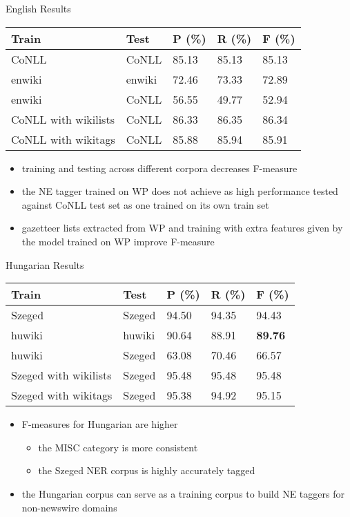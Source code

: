 \documentclass[utf8x,t]{beamer}
\newcommand{\vitem}{\item \vspace{4pt}}
\begin{document}
\begin{frame}{English Results}

\begin{center}
\begin{tabular}{lllll}
\hline \bf Train & \bf Test & \bf P (\%) & \bf R (\%) & \bf F (\%) \\ \hline
CoNLL & CoNLL & 85.13 & 85.13 & 85.13 \\
enwiki & enwiki & 72.46 & 73.33 &  72.89 \\
enwiki & CoNLL & 56.55 & 49.77 & 52.94 \\
CoNLL with wikilists & CoNLL & 86.33 & 86.35 & 86.34 \\
CoNLL with wikitags & CoNLL & 85.88 & 85.94 & 85.91 \\
\hline
\end{tabular}
\end{center}

\begin{itemize}
\item training and testing across different corpora decreases F-measure
\item the NE tagger trained on WP does not achieve as high performance tested against CoNLL test set as one trained on its own train set
\item gazetteer lists extracted from WP and training with extra features given by the model trained on WP improve F-measure
\end{itemize}

\end{frame}

\begin{frame}{Hungarian Results}

\begin{center}
\begin{tabular}{lllll}
\hline \bf Train & \bf Test & \bf P (\%) & \bf R (\%) & \bf F (\%) \\ \hline
Szeged  & Szeged  & 94.50 & 94.35 & 94.43 \\
huwiki & huwiki & 90.64 & 88.91 &  \textbf{89.76} \\
huwiki & Szeged  & 63.08 & 70.46 & 66.57 \\
Szeged  with wikilists & Szeged  & 95.48 & 95.48 & 95.48 \\
Szeged  with wikitags & Szeged  & 95.38 & 94.92 & 95.15 \\
\hline
\end{tabular}
\end{center}

\begin{itemize}
\vitem F-measures for Hungarian are higher 
\begin{itemize}
\vitem the MISC category is more consistent
\vitem the Szeged NER corpus is highly accurately tagged 
\end{itemize}
\vitem the Hungarian corpus can serve as a training corpus to build NE taggers for non-newswire domains
\end{itemize}

\end{frame}
\end{document}
